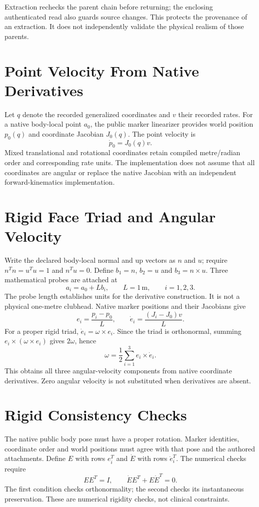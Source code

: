 \documentclass[11pt]{article}
\begin{document}
Extraction rechecks the parent chain before returning; the enclosing authenticated
read also guards source changes. This protects the provenance of an extraction.
It does not independently validate the physical realism of those parents.

\newpage
\section*{Point Velocity From Native Derivatives}
Let $q$ denote the recorded generalized coordinates and $v$ their recorded rates.
For a native body-local point $a_0$, the public marker linearizer provides world
position $p_0(q)$ and coordinate Jacobian $J_0(q)$. The point velocity is
\[
  \dot p_0=J_0(q)v.
\]
Mixed translational and rotational coordinates retain compiled metre/radian
order and corresponding rate units. The implementation does not assume that
all coordinates are angular or replace the native Jacobian with an independent
forward-kinematics implementation.

\section*{Rigid Face Triad and Angular Velocity}
Write the declared body-local normal and up vectors as $n$ and $u$; require
$n^Tn=u^Tu=1$ and $n^Tu=0$. Define $b_1=n$, $b_2=u$ and $b_3=n\times u$.
Three mathematical probes are attached at
\[
  a_i=a_0+L b_i,\qquad L=1\,\mathrm{m},\qquad i=1,2,3.
\]
The probe length establishes units for the derivative construction. It is not
a physical one-metre clubhead. Native marker positions and their Jacobians give
\[
 e_i=\frac{p_i-p_0}{L},\qquad
 \dot e_i=\frac{(J_i-J_0)v}{L}.
\]
For a proper rigid triad, $\dot e_i=\omega\times e_i$. Since the triad is
orthonormal, summing $e_i\times(\omega\times e_i)$ gives $2\omega$, hence
\[
  \boxed{\displaystyle\omega=\frac12\sum_{i=1}^3 e_i\times\dot e_i.}
\]
This obtains all three angular-velocity components from native coordinate
derivatives. Zero angular velocity is not substituted when derivatives are absent.

\section*{Rigid Consistency Checks}
The native public body pose must have a proper rotation. Marker identities,
coordinate order and world positions must agree with that pose and the authored
attachments. Define $E$ with rows $e_i^T$ and $\dot E$ with rows $\dot e_i^T$.
The numerical checks require
\[
 EE^T=I,\qquad \dot E E^T+E\dot E^T=0.
\]
The first condition checks orthonormality; the second checks its instantaneous
preservation. These are numerical rigidity checks, not clinical constraints.
\end{document}
